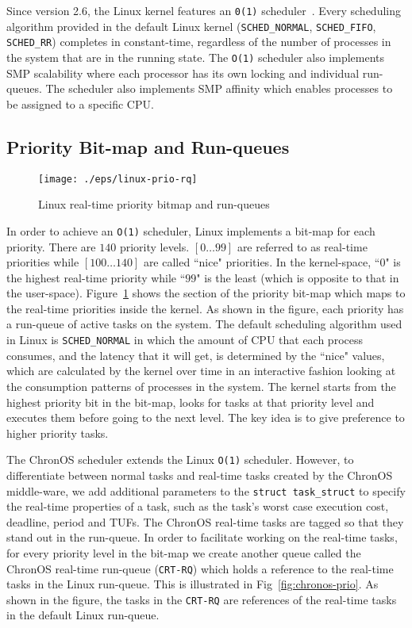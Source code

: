 \documentclass[12pt,dvips]{report}
\begin{document}
Since version 2.6, the Linux kernel features an \texttt{0(1)} scheduler~\cite{love-book}. Every scheduling algorithm provided in the default Linux kernel (\texttt{SCHED\_NORMAL}, \texttt{SCHED\_FIFO}, \texttt{SCHED\_RR}) completes in constant-time, regardless of the number of processes in the system that are in the running state. The \texttt{O(1)} scheduler also implements SMP scalability where each processor has its own locking and individual run-queues. The scheduler also implements SMP affinity which enables processes to be assigned to a specific CPU.

\subsection{Priority Bit-map and Run-queues}

\begin{figure} [htbp]
  \centering
  \texttt{[image: ./eps/linux-prio-rq]}
  \caption{Linux real-time priority bitmap and run-queues}
  \label{fig:linux-prio}
\end{figure}

In order to achieve an \texttt{O(1)} scheduler, Linux implements a bit-map for each priority. There are $140$ priority levels. $[0 \hdots 99]$ are referred to as real-time priorities while $[100 \hdots 140]$ are called ``nice" priorities. In the kernel-space, ``$0$" is the highest real-time priority while ``$99$" is the least (which is opposite to that in the user-space). Figure~\ref{fig:linux-prio} shows the section of the priority bit-map which maps to the real-time priorities inside the kernel. As shown in the figure, each priority has a run-queue of active tasks on the system. The default scheduling algorithm used in Linux is \texttt{SCHED\_NORMAL} in which the amount of CPU that each process consumes, and the latency that it will get, is determined by the ``nice" values, which are calculated by the kernel over time in an interactive fashion looking at the consumption patterns of processes in the system. The kernel starts from the highest priority bit in the bit-map, looks for tasks at that priority level and executes them before going to the next level. The key idea is to give preference to higher priority tasks.

The ChronOS scheduler extends the Linux \texttt{O(1)} scheduler. However, to differentiate between normal tasks and real-time tasks created by the ChronOS middle-ware, we add additional parameters to the \texttt{struct task\_struct} to specify the real-time properties of a task, such as the task's worst case execution cost, deadline, period and TUFs. The ChronOS real-time tasks are tagged so that they stand out in the run-queue. In order to facilitate working on the real-time tasks, for every priority level in the bit-map we create another queue called the ChronOS real-time run-queue (\texttt{CRT-RQ}) which holds a reference to the real-time tasks in the Linux run-queue. This is illustrated in Fig~\ref{fig:chronos-prio}. As shown in the figure, the tasks in the \texttt{CRT-RQ} are references of the real-time tasks in the default Linux run-queue.
\end{document}
